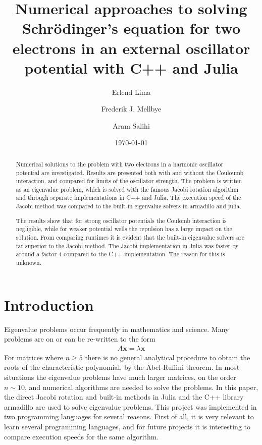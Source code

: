 \documentclass[aps,reprint]{revtex4-1}
\begin{document}
\title{Numerical approaches to solving Schrödinger's equation for
two electrons in an external oscillator potential with C++ and Julia}
\author{Erlend Lima}
\author{Frederik J. Mellbye}
\author{Aram Salihi}
\date{\today}

\begin{abstract}
Numerical solutions to the problem with two electrons in a harmonic oscillator
potential are investigated. Results are presented both with and without
the Couloumb interaction, and compared for limits of the oscillator strength.
The problem is written as an eigenvalue problem, which is solved with the
famous Jacobi rotation algorithm and through separate implementations in C++ and Julia.
The execution speed of the Jacobi method was compared to the built-in eigenvalue solvers
in armadillo and julia.

The results show that for strong oscillator potentials the Coulomb interaction is negligible,
while for weaker potential wells the repulsion has a large impact on the solution. From
comparing runtimes it is evident that the built-in eigenvalue solvers are far superior
to the Jacobi method. The Jacobi implementation in Julia was faster by around a factor
4 compared to the C++ implementation. The reason for this is unknown.
\end{abstract}
\maketitle
\tableofcontents
\makeatletter
\let\toc@pre\relax
\let\toc@post\relax
\makeatother

\newpage

\section{Introduction}
\label{sec:introduction}
Eigenvalue problems occur frequently in mathematics and science. Many problems
are on or can be re-written to the form
\begin{align*}
  A \mathbf{x} = \lambda \mathbf{x}
\end{align*}
For matrices where $n \geq 5$ there is
no general analytical procedure to obtain the roots of the characteristic polynomial, by the
Abel-Ruffini theorem. In most situations the eigenvalue problems have much
larger matrices, on the order \(n\sim 10\), and numerical algorithms are needed to solve the problems. In
this paper, the direct Jacobi rotation and built-in methods in Julia and the C++
library armadillo are used to solve eigenvalue problems. This project was implemented
in two programming languages for several reasons. First of all, it is very relevant to
learn several programming languages, and for future projects it is interesting
to compare execution speeds for the same algorithm.
\end{document}
